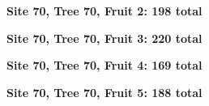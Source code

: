 \documentclass[
  openany]{krantz}
\begin{document}
\StrokeFive\StrokeFive\StrokeFive\StrokeFive\StrokeFive\StrokeFive\StrokeFive\StrokeFive\StrokeFive\StrokeFive\StrokeFive\StrokeFive\StrokeFive\StrokeFive\StrokeFive\StrokeFive\StrokeFive\StrokeFive\StrokeFive\StrokeFive

\StrokeFive\StrokeFive\StrokeFive\StrokeFive\StrokeFive\StrokeFive\StrokeFive\StrokeThree

\textbf{Site 70, Tree 70, Fruit 2: 198 total}

\StrokeFive\StrokeFive\StrokeFive\StrokeFive\StrokeFive\StrokeFive\StrokeFive\StrokeFive\StrokeFive\StrokeFive\StrokeFive\StrokeFive\StrokeFive\StrokeFive\StrokeFive\StrokeFive\StrokeFive\StrokeFive\StrokeFive\StrokeFive

\StrokeFive\StrokeFive\StrokeFive\StrokeFive\StrokeFive\StrokeFive\StrokeFive\StrokeFive\StrokeFive\StrokeFive\StrokeFive\StrokeFive\StrokeFive\StrokeFive\StrokeFive\StrokeFive\StrokeFive\StrokeFive\StrokeFive\StrokeThree

\textbf{Site 70, Tree 70, Fruit 3: 220 total}

\StrokeFive\StrokeFive\StrokeFive\StrokeFive\StrokeFive\StrokeFive\StrokeFive\StrokeFive\StrokeFive\StrokeFive\StrokeFive\StrokeFive\StrokeFive\StrokeFive\StrokeFive\StrokeFive\StrokeFive\StrokeFive\StrokeFive\StrokeFive

\StrokeFive\StrokeFive\StrokeFive\StrokeFive\StrokeFive\StrokeFive\StrokeFive\StrokeFive\StrokeFive\StrokeFive\StrokeFive\StrokeFive\StrokeFive\StrokeFive\StrokeFive\StrokeFive\StrokeFive\StrokeFive\StrokeFive\StrokeFive

\StrokeFive\StrokeFive\StrokeFive\StrokeFive

\textbf{Site 70, Tree 70, Fruit 4: 169 total}

\StrokeFive\StrokeFive\StrokeFive\StrokeFive\StrokeFive\StrokeFive\StrokeFive\StrokeFive\StrokeFive\StrokeFive\StrokeFive\StrokeFive\StrokeFive\StrokeFive\StrokeFive\StrokeFive\StrokeFive\StrokeFive\StrokeFive\StrokeFive

\StrokeFive\StrokeFive\StrokeFive\StrokeFive\StrokeFive\StrokeFive\StrokeFive\StrokeFive\StrokeFive\StrokeFive\StrokeFive\StrokeFive\StrokeFive\StrokeFour

\textbf{Site 70, Tree 70, Fruit 5: 188 total}

\StrokeFive\StrokeFive\StrokeFive\StrokeFive\StrokeFive\StrokeFive\StrokeFive\StrokeFive\StrokeFive\StrokeFive\StrokeFive\StrokeFive\StrokeFive\StrokeFive\StrokeFive\StrokeFive\StrokeFive\StrokeFive\StrokeFive\StrokeFive

\StrokeFive\StrokeFive\StrokeFive\StrokeFive\StrokeFive\StrokeFive\StrokeFive\StrokeFive\StrokeFive\StrokeFive\StrokeFive\StrokeFive\StrokeFive\StrokeFive\StrokeFive\StrokeFive\StrokeFive\StrokeThree
\end{document}
